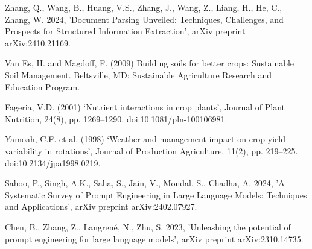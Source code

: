\documentclass{article} %
\begin{document}
\begin{thebibliography}{9}
Zhang, Q., Wang, B., Huang, V.S., Zhang, J., Wang, Z., Liang, H., He, C., Zhang, W. 2024, 'Document Parsing Unveiled: Techniques, Challenges, and Prospects for
  Structured Information Extraction', arXiv preprint arXiv:2410.21169.

 Van Es, H. and Magdoff, F. (2009) Building soils for better crops: Sustainable Soil Management. Beltsville, MD: Sustainable Agriculture Research and Education Program. 

 Fageria, V.D. (2001) ‘Nutrient interactions in crop plants’, Journal of Plant Nutrition, 24(8), pp. 1269–1290. doi:10.1081/pln-100106981. 

 Yamoah, C.F. et al. (1998) ‘Weather and management impact on crop yield variability in rotations’, Journal of Production Agriculture, 11(2), pp. 219–225. doi:10.2134/jpa1998.0219. 

 Sahoo, P., Singh, A.K., Saha, S., Jain, V., Mondal, S., Chadha, A. 2024, 'A Systematic Survey of Prompt Engineering in Large Language Models:
  Techniques and Applications', arXiv preprint arXiv:2402.07927.


 Chen, B., Zhang, Z., Langrené, N., Zhu, S. 2023, 'Unleashing the potential of prompt engineering for large language models', arXiv preprint arXiv:2310.14735.

\end{thebibliography}
\end{document}
